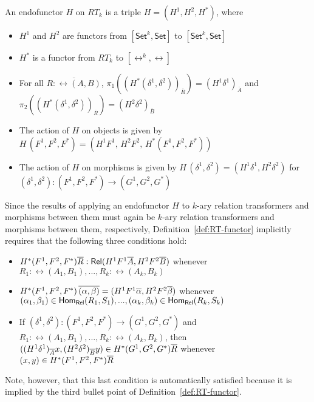 \documentclass{lmcs}
\theoremstyle{plain}\newtheorem{satz}[thm]{Satz}
\newcommand{\set}{\mathsf{Set}}
\begin{document}
\begin{defi}\label{def:RT-functor}
An endofunctor $H$ on $RT_k$ is a triple $H = (H^1,H^2,H^*)$, where
\begin{itemize}
\item $H^1$ and $H^2$ are functors from $[\set^k,\set]$ to $[\set^k,\set]$
\item $H^*$ is a functor from $RT_k$ to $[\rel^k,\rel]$
\item For all $\overline{R : \rel(A,B)}$,
  $\pi_1((H^*(\delta^1,\delta^2))_{\overline{R}}) = (H^1
  \delta^1)_{\overline{A}}$ and
  $\pi_2((H^*(\delta^1,\delta^2))_{\overline{R}}) = (H^2
  \delta^2)_{\overline{B}}$
\item The action of $H$ on objects is given by $H\,(F^1,F^2,F^*) =
  (H^1F^1,\,H^2F^2,\,H^*(F^1,F^2,F^*))$
\item The action of $H$ on morphisms is given by
  $H\,(\delta^1,\delta^2) = (H^1\delta^1,H^2\delta^2)$ for
  $(\delta^1,\delta^2) : (F^1,F^2,F^*)\to (G^1,G^2,G^*)$
\end{itemize}
\end{defi}
Since the results of applying an endofunctor $H$ to $k$-ary relation
transformers and morphisms between them must again be $k$-ary relation
transformers and morphisms between them, respectively,
Definition~\ref{def:RT-functor} implicitly requires that the following
three conditions hold:
\begin{itemize}
\item $H^*(F^1,F^2,F^*) \overline{R} : \mathsf{Rel}(H^1F^1 \overline{A}, H^2F^2 \overline{B})$
  whenever $R_1:\rel(A_1,B_1),...,R_k:\rel(A_k,B_k)$
\item $H^*(F^1,F^2,F^*)\, \overline{(\alpha, \beta)} = (H^1F^1\overline{\alpha},
  H^2F^2 \overline{\beta})$ whenever $(\alpha_1, \beta_1) \in
  \mathsf{Hom_{Rel}}(R_1,S_1),..., (\alpha_k, \beta_k) \in \mathsf{Hom_{Rel}}(R_k,S_k)$
\item If $(\delta^1,\delta^2) : (F^1,F^2,F^*)\to (G^1,G^2,G^*)$ and
  $R_1:\rel(A_1,B_1),...,R_k:\rel(A_k,B_k)$, then
  $((H^1\delta^1)_{\overline{A}}x, (H^2\delta^2)_{\overline{B}}y) \in
  H^*(G^1,G^2,G^*)\overline{R}$ whenever $(x, y) \in H^*(F^1,F^2,F^*)\overline{R}$
\end{itemize}
  Note, however, that this last condition is
  automatically satisfied because it is implied by the third bullet
  point of Definition~\ref{def:RT-functor}.
\end{document}
